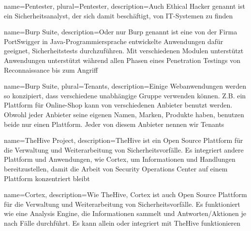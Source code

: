 {
    name={Pentester},
    plural={Pentester},
    description={Auch Ethical Hacker genannt ist ein Sicherheitsanalyst, der sich damit beschäftigt,   von IT-Systemen zu finden\cite{pentester}}   
}

 {
    name={Burp Suite},
    description={Oder nur Burp genannt ist eine von der Firma PortSwigger in Java-Programmiersprache entwickelte Anwendungen dafür geeignet, Sicherheitstests durchzuführen. Mit verschiedenen Modulen unterstützt Anwendungen unterstützt während allen Phasen eines Penetration Testings von Reconnaissance bis zum Angriff \cite{burp}}   
}

 {
    name={Burp Suite},
    plural={Tenants},
    description={Einige Webanwendungen werden so konzipiert, dass verschiedene unabhängige Gruppe verwenden können. Z.B. ein Plattform für Online-Shop kann von verschiedenen Anbieter benutzt werden. Obwohl jeder Anbieter seine eigenen Namen, Marken, Produkte haben, benutzen beide nur einen Plattform. Jeder von diesem Anbieter nennen wir Tenants}   
}

 {
    name={TheHive Project},
    description={TheHive ist ein Open Source Plattform für die Verwaltung und Weiterarbeitung von Sicherheitsvorfälle. Es integriert andere Plattform und Anwendungen, wie Cortex, um Informationen und Handlungen bereitzustellen, damit die Arbeit von Security Operations Center auf einem Plattform konzentriert bleibt \cite{TheHive}}   
}

 {
    name={Cortex},
    description={Wie \gls{TheHive}, Cortex ist auch Open Source Plattform für die Verwaltung und Weiterarbeitung von Sicherheitsvorfälle. Es funktioniert wie eine Analysis Engine, die Informationen sammelt und Antworten/Aktionen je nach Fälle durchführt. Es kann allein oder integriert mit TheHive funktionieren \cite{TheHive}}   
}



    